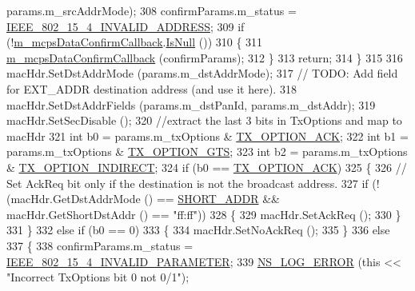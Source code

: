 \begin{DoxyCode}
      params.m\_srcAddrMode);
308       confirmParams.m\_status = \hyperlink{group__lr-wpan_gga50d67c8816b2ca8da8df30d045b1b705a4a8505d97c4183f601f17d5362bada9d}{IEEE\_802\_15\_4\_INVALID\_ADDRESS};
309       \textcolor{keywordflow}{if} (!\hyperlink{classns3_1_1LrWpanMac_a05eba7a98d1cbbf86151290069e093e0}{m\_mcpsDataConfirmCallback}.\hyperlink{classns3_1_1Callback_aa8e27826badbf37f84763f36f70d9b54}{IsNull} ())
310         \{
311           \hyperlink{classns3_1_1LrWpanMac_a05eba7a98d1cbbf86151290069e093e0}{m\_mcpsDataConfirmCallback} (confirmParams);
312         \}
313       \textcolor{keywordflow}{return};
314     \}
315 
316   macHdr.SetDstAddrMode (params.m\_dstAddrMode);
317   \textcolor{comment}{// TODO: Add field for EXT\_ADDR destination address (and use it here).}
318   macHdr.SetDstAddrFields (params.m\_dstPanId, params.m\_dstAddr);
319   macHdr.SetSecDisable ();
320   \textcolor{comment}{//extract the last 3 bits in TxOptions and map to macHdr}
321   \textcolor{keywordtype}{int} b0 = params.m\_txOptions & \hyperlink{group__lr-wpan_gga74ea891230ebf45d80d69a67266930a4a270a37d12b62bb8b5e92d646456244cf}{TX\_OPTION\_ACK};
322   \textcolor{keywordtype}{int} b1 = params.m\_txOptions & \hyperlink{group__lr-wpan_gga74ea891230ebf45d80d69a67266930a4a92b73ac4060ce7bc7ed5cf614cd48bfc}{TX\_OPTION\_GTS};
323   \textcolor{keywordtype}{int} b2 = params.m\_txOptions & \hyperlink{group__lr-wpan_gga74ea891230ebf45d80d69a67266930a4a3f550efd3c932bcf500a567e30d6fa3e}{TX\_OPTION\_INDIRECT};
324   \textcolor{keywordflow}{if} (b0 == \hyperlink{group__lr-wpan_gga74ea891230ebf45d80d69a67266930a4a270a37d12b62bb8b5e92d646456244cf}{TX\_OPTION\_ACK})
325     \{
326       \textcolor{comment}{// Set AckReq bit only if the destination is not the broadcast address.}
327       \textcolor{keywordflow}{if} (!(macHdr.GetDstAddrMode () == \hyperlink{group__lr-wpan_gga9ea4702ab11d5329e1593afebce06bbba7bf58267dde39bdabfeeb5793450c5e3}{SHORT\_ADDR} && macHdr.GetShortDstAddr () == \textcolor{stringliteral}{"ff:ff"}))
328         \{
329           macHdr.SetAckReq ();
330         \}
331     \}
332   \textcolor{keywordflow}{else} \textcolor{keywordflow}{if} (b0 == 0)
333     \{
334       macHdr.SetNoAckReq ();
335     \}
336   \textcolor{keywordflow}{else}
337     \{
338       confirmParams.m\_status = \hyperlink{group__lr-wpan_gga50d67c8816b2ca8da8df30d045b1b705a5c8b06d425e18155370ce481538e74de}{IEEE\_802\_15\_4\_INVALID\_PARAMETER};
339       \hyperlink{group__logging_ga0261a8db1d4ac5f79417d117634fd455}{NS\_LOG\_ERROR} (\textcolor{keyword}{this} << \textcolor{stringliteral}{"Incorrect TxOptions bit 0 not 0/1"});

\end{DoxyCode}
